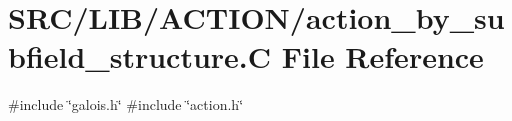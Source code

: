 \hypertarget{action__by__subfield__structure_8_c}{}\section{S\+R\+C/\+L\+I\+B/\+A\+C\+T\+I\+O\+N/action\+\_\+by\+\_\+subfield\+\_\+structure.C File Reference}
\label{action__by__subfield__structure_8_c}
{\ttfamily \#include \char`\"{}galois.\+h\char`\"{}}\newline
{\ttfamily \#include \char`\"{}action.\+h\char`\"{}}\newline
